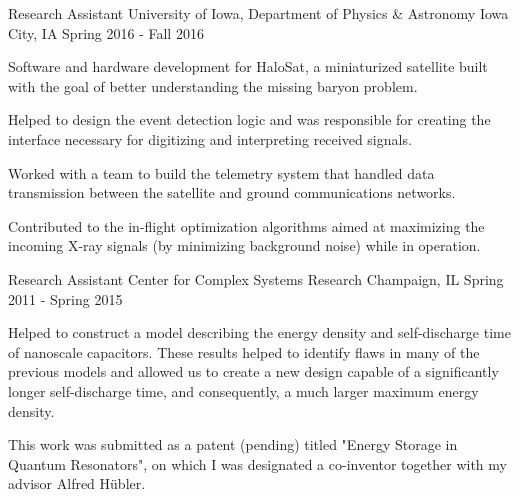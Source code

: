 

\begin{cventries}

  \cventry
  {Research Assistant} %
  {University of Iowa, Department of Physics \& Astronomy} %
  {Iowa City, IA} %
  {Spring 2016 - Fall 2016} %
  {
      \begin{cvitems} %
      \item {Software and hardware development for HaloSat, a miniaturized
              satellite built with the goal of better understanding the missing
              baryon problem.}
      \item {Helped to design the event detection logic and was responsible for
              creating the interface necessary for digitizing and interpreting
              received signals.}
      \item {Worked with a team to build the telemetry system that handled data
              transmission between the satellite and ground communications
              networks.}
      \item {Contributed to the in-flight optimization algorithms aimed at
              maximizing the incoming X-ray signals (by minimizing background
              noise) while in operation.}
      \end{cvitems}
  }

  \cventry
  {Research Assistant} %
  {Center for Complex Systems Research} %
  {Champaign, IL}
  {Spring 2011 - Spring 2015}
  {
      \begin{cvitems} 
          \item {Helped to construct a model describing the energy density and
                  self-discharge time of nanoscale capacitors. These results
                  helped to identify flaws in many of the previous models and
                  allowed us to create a new design capable of a significantly
                  longer self-discharge time, and consequently, a much larger
                  maximum energy density.} 
          \item {This work was submitted as a patent (pending) titled "Energy
                  Storage in Quantum Resonators", on which I was designated a
                  co-inventor together with my advisor Alfred H\"ubler.}
      \end{cvitems}
  }

\end{cventries}
